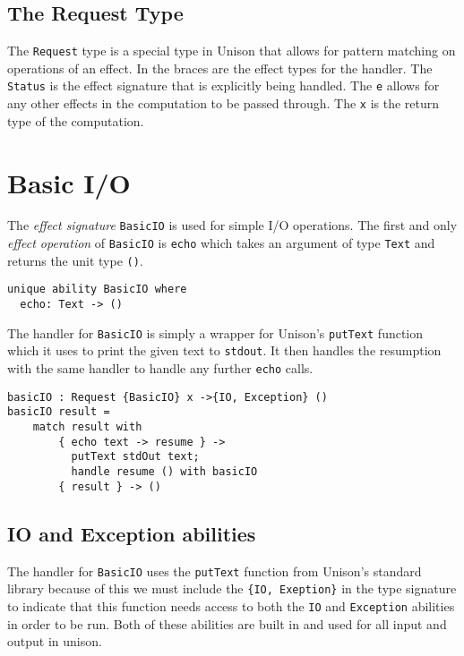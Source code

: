 \documentclass[logo,bsc,singlespacing,parskip]{infthesis}
\begin{document}
\subsection{The Request Type}

The \texttt{Request} type is a special type in Unison that allows for pattern
matching on operations of an effect. In the braces are the effect types for the
handler. The \texttt{Status} is the effect signature that is explicitly being
handled. The \texttt{e} allows for any other effects in the computation to be
passed through. The \texttt{x} is the return type of the computation.

\section{Basic I/O}
\label{io}

The \emph{effect signature} \texttt{BasicIO} is used for simple I/O operations.
The first and only \emph{effect operation} of \texttt{BasicIO} is \texttt{echo}
which takes an argument of type \texttt{Text} and returns the unit
type \texttt{()}. 

\begin{lstlisting}[language=unison]
unique ability BasicIO where
  echo: Text -> ()
\end{lstlisting}

The handler for \texttt{BasicIO} is simply a wrapper for Unison's
\texttt{putText} function which it uses to print the given text to
\texttt{stdout}. It then handles the resumption with the same handler to handle
any further \texttt{echo} calls.

\begin{lstlisting}[language=unison]
basicIO : Request {BasicIO} x ->{IO, Exception} ()
basicIO result =
    match result with
        { echo text -> resume } -> 
          putText stdOut text; 
          handle resume () with basicIO
        { result } -> ()
\end{lstlisting}

\subsection{IO and Exception abilities}

The handler for \texttt{BasicIO} uses the \texttt{putText} function from
Unison's standard library because of this we must include the \texttt{\{IO,
Exeption\}} in the type signature to indicate that this function needs access
to both the \texttt{IO} and \texttt{Exception} abilities in order to be run.
Both of these abilities are built in and used for all input and output in
unison.
\end{document}
